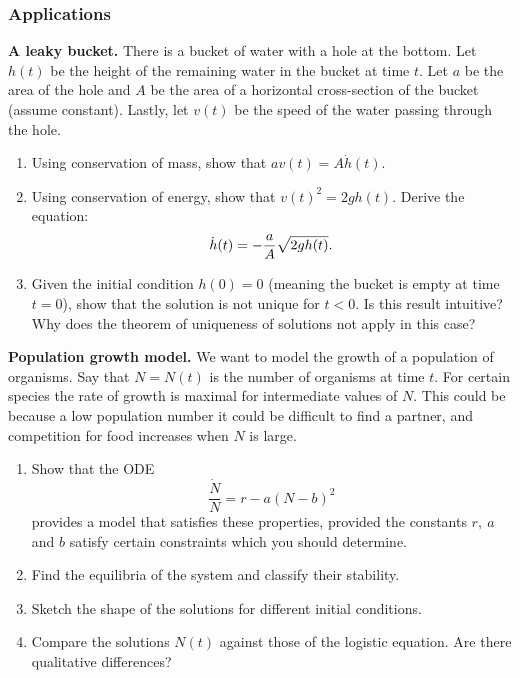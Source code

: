 \documentclass{article}
\begin{document}
\subsubsection*{Applications}
\begin{question} \textbf{A leaky bucket.}
There is a bucket of water with a hole at the bottom. Let $h(t)$ be the height of the remaining water in the bucket at time $t$. Let $a$ be the area of the hole and $A$ be the area of a horizontal cross-section of the bucket (assume constant). Lastly, let $v(t)$ be the speed of the water passing through the hole.

\begin{enumerate}[label=(\alph*)]
\item Using conservation of mass, show that $av(t) = A \dot h(t)$.
\item Using conservation of energy, show that $v(t)^2=2gh(t)$. Derive the equation:
\begin{equation}
   \dot h(t) = -{a\over A} \sqrt{2g h(t)}.
\end{equation}
\item Given the initial condition $h(0)=0$ (meaning the bucket is empty at time $t=0$), show that the solution is not unique for $t<0$. Is this result intuitive? Why does the theorem of uniqueness of solutions not apply in this case?
\end{enumerate}
\end{question}


\begin{question}
\textbf{Population growth model.} We want to model the growth of a population of organisms. Say that $N=N(t)$ is the number of organisms at time $t$. For certain species the rate of growth is maximal for intermediate values of $N$. This could be because a low population number it could be difficult to find a partner, and competition for food increases when $N$ is large.
\begin{enumerate}[label=(\alph*)]
\item Show that the ODE
\begin{equation}
  \frac{\dot N}{N} = r-a(N-b)^2
\end{equation}
provides a model that satisfies these properties, provided the constants $r,\ a$ and $b$ satisfy certain constraints which you should determine.
\item Find the equilibria of the system and classify their stability.
\item Sketch the shape of the solutions for different initial conditions.
\item Compare the solutions $N(t)$ against those of the logistic equation. Are there qualitative differences?
\end{enumerate}
\end{question}

 
\end{document}
